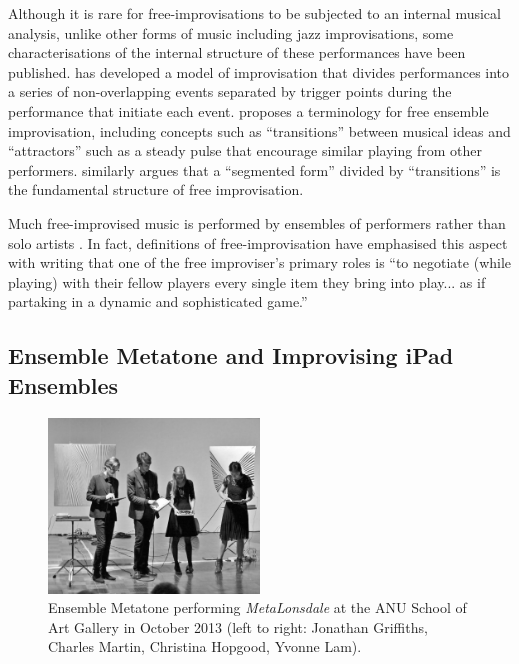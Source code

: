 \documentclass[graybox]{svmult}
\begin{document}
Although it is rare for free-improvisations to be subjected to an
internal musical analysis, unlike other forms of music including jazz
improvisations, some characterisations of the internal structure of
these performances have been published.
\citet{Pressing:1988uo} has developed a model of improvisation
that divides performances into a series of non-overlapping events
separated by trigger points during the performance that initiate each
event. \citet{Stenstrom:2009xy} proposes a terminology for free ensemble
improvisation, including concepts such as ``transitions'' between
musical ideas and ``attractors'' such as a steady pulse that encourage
similar playing from other performers.
\citet{Nunn:1998ly} similarly argues that a ``segmented form''
divided by ``transitions'' is the fundamental structure of free
improvisation.

Much free-improvised music is performed by ensembles of performers
rather than solo artists \citep{Stenstrom:2009xy}. In fact, definitions
of free-improvisation have emphasised this aspect with  \citet{Mazzola:2009cr} writing
that one of the free improviser's primary roles is ``to negotiate
(while playing) with their fellow players every single item they bring
into play... as if partaking in a dynamic and sophisticated
game.''

\subsection{Ensemble Metatone and Improvising iPad Ensembles}

\begin{figure}
  \centering
  \includegraphics[width=0.5\textwidth]{figures/ensemblemetatone-bw}
  \caption{Ensemble Metatone performing \emph{MetaLonsdale} at the ANU
    School of Art Gallery in October 2013 (left to right: Jonathan
    Griffiths, Charles Martin, Christina Hopgood, Yvonne Lam).}
  \label{ensemblemetatoneperforming}
\end{figure}
\end{document}
